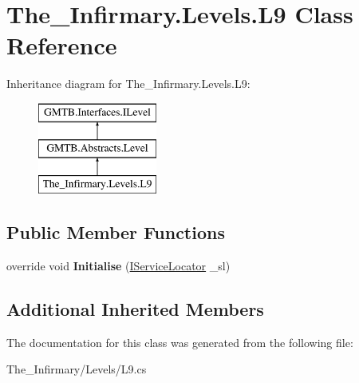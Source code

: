 \hypertarget{class_the___infirmary_1_1_levels_1_1_l9}{}\section{The\+\_\+\+Infirmary.\+Levels.\+L9 Class Reference}
\label{class_the___infirmary_1_1_levels_1_1_l9}
Inheritance diagram for The\+\_\+\+Infirmary.\+Levels.\+L9\+:\begin{figure}[H]
\begin{center}
\leavevmode
\includegraphics[height=3.000000cm]{class_the___infirmary_1_1_levels_1_1_l9}
\end{center}
\end{figure}
\subsection*{Public Member Functions}
\begin{DoxyCompactItemize}
\item 
\mbox{\label{class_the___infirmary_1_1_levels_1_1_l9_a4c00f07d3adeb5fc814f9692efd5adc6}} 
override void {\bfseries Initialise} (\mbox{\hyperlink{interface_g_m_t_b_1_1_interfaces_1_1_i_service_locator}{I\+Service\+Locator}} \+\_\+sl)
\end{DoxyCompactItemize}
\subsection*{Additional Inherited Members}


The documentation for this class was generated from the following file\+:\begin{DoxyCompactItemize}
\item 
The\+\_\+\+Infirmary/\+Levels/L9.\+cs\end{DoxyCompactItemize}
